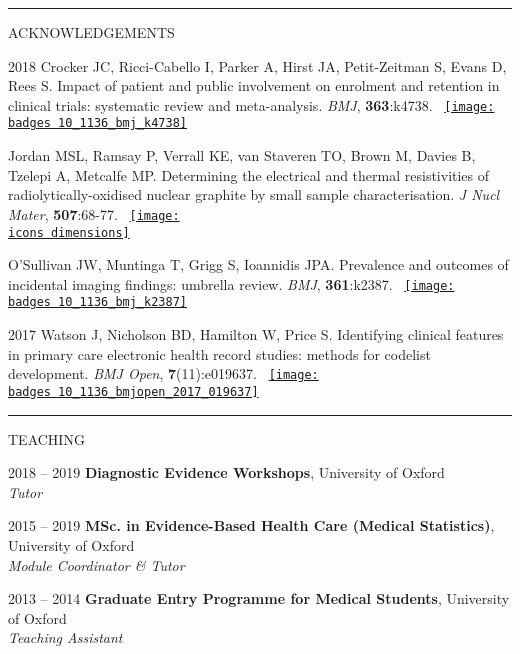 \documentclass[10pt,a4paper]{article}
\def\badges{./badges/}
\def\icons{./icons/}
\begin{document}
\noindent\rule{\textwidth}{0.4pt}
\begin{cvlist}{ACKNOWLEDGEMENTS}
	
	\item[2018]
	Crocker JC, Ricci-Cabello I, Parker A, Hirst JA, Petit-Zeitman S, Evans D, Rees S. Impact of patient and public involvement on enrolment and retention in clinical trials: systematic review and meta-analysis. \textit{BMJ}, \textbf{363}:k4738. ~\href{https://bmj.altmetric.com/details/51859816}{\texttt{[image: \\badges 10\_1136\_bmj\_k4738]}}
	
	\item[]
	Jordan MSL, Ramsay P, Verrall KE, van Staveren TO, Brown M, Davies B, Tzelepi A, Metcalfe MP. Determining the electrical and thermal resistivities of radiolytically-oxidised nuclear graphite by small sample characterisation. \textit{J Nucl Mater}, \textbf{507}:68-77. ~\href{https://badge.dimensions.ai/details/id/pub.1103593195}{\texttt{[image: \\icons dimensions]}}
	
	\item[]
	O'Sullivan JW, Muntinga T, Grigg S, Ioannidis JPA. Prevalence and outcomes of incidental imaging findings: umbrella review. \textit{BMJ}, \textbf{361}:k2387. ~\href{https://bmj.altmetric.com/details/43831617}{\texttt{[image: \\badges 10\_1136\_bmj\_k2387]}}
	
	\item[2017]
	Watson J, Nicholson BD, Hamilton W, Price S. Identifying clinical features in primary care electronic health record studies: methods for codelist development. \textit{BMJ Open}, \textbf{7}(11):e019637. ~\href{https://bmj.altmetric.com/details/29319273}{\texttt{[image: \\badges 10\_1136\_bmjopen\_2017\_019637]}}
	
\end{cvlist}


\noindent\rule{\textwidth}{0.4pt}
\begin{cvlist}{TEACHING}
	
	\item[2018 -- 2019]
	\textbf{Diagnostic Evidence Workshops}, University of Oxford \\
	\textit{Tutor}
	
	\item[2015 -- 2019]
	\textbf{MSc. in Evidence-Based Health Care (Medical Statistics)}, University of Oxford \\
	\textit{Module Coordinator \& Tutor}
	
	\item[2013 -- 2014]
	\textbf{Graduate Entry Programme for Medical Students}, University of Oxford \\
	\textit{Teaching Assistant}
	
\end{cvlist}
\end{document}
